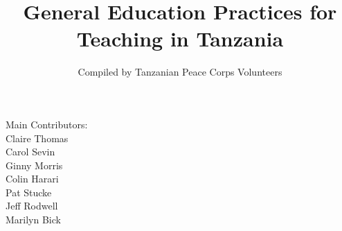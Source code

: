 \documentclass[12pt,a4paper]{book}
\author{Compiled by Tanzanian Peace Corps Volunteers}
\title{General Education Practices for Teaching in Tanzania}
\begin{document}


\tableofcontents


\vfill
\begin{center}
Main Contributors:\\
Claire Thomas\\
Carol Sevin\\
Ginny Morris\\
Colin Harari\\ 
Pat Stucke\\
Jeff Rodwell\\
Marilyn Bick\\
\end{center}















\end{document}
